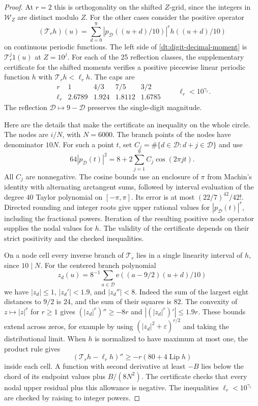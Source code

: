 \documentclass[11pt,a4paper]{article}
\theoremstyle{paperplain}
\numberwithin{equation}{section}
\newcommand{\e}{\mathrm e}
\begin{document}
\begin{proof}
At \(r=2\) this is orthogonality on the shifted \(Z\)-grid,
since the integers in \(\mathcal W_Z\) are distinct modulo \(Z\).
For the other cases consider the positive operator
\[
 (\mathcal T_r h)(u)
 =\sum_{d=0}^9 |p_{\mathcal D}((u+d)/10)|^r h((u+d)/10)
\]
on continuous periodic functions. The left side of
\eqref{dt:digit-decimal-moment} is \(\mathcal T_r^j1(u)\) at \(Z=10^j\).
For each of the 25 reflection classes, the supplementary certificate
 for the shifted moments
verifies a positive piecewise linear periodic function \(h\)
with \(\mathcal T_r h<\ell_r h\). The caps are
\[
\begin{array}{c|cccc}
 r&1&4/3&7/5&3/2\\ \hline
 \ell_r&2.6789&1.924&1.8112&1.6785
\end{array}
\qquad \ell_r<10^{\gamma_r}.
\]
The reflection \(\mathcal D\mapsto9-\mathcal D\) preserves the single-digit magnitude.

Here are the details that make the certificate an inequality on the
whole circle. The nodes are \(i/N\), with \(N=6000\).
The branch points of the nodes have
denominator \(10N\). For such a point \(t\), set
\(C_j=\#\{d\in\mathcal D:d+j\in\mathcal D\}\) and use
\[
 64|p_{\mathcal D}(t)|^2=8+2\sum_{j=1}^{9}C_j\cos(2\pi jt).
\]
All \(C_j\) are nonnegative. The cosine bounds use an enclosure
of \(\pi\) from Machin's identity with alternating arctangent
sums, followed by interval evaluation of the degree \(40\)
Taylor polynomial on \([-\pi,\pi]\). Its error is at most
\((22/7)^{42}/42!\). Directed rounding and integer roots give
upper rational values for \(|p_{\mathcal D}(t)|^r\), including the fractional
powers. Iteration of the resulting positive node operator supplies
the nodal values for \(h\). The validity of the certificate depends
on their strict positivity and the checked inequalities.

On a node cell every inverse branch of \(\mathcal T_r\) lies in a
single linearity interval of \(h\), since \(10\mid N\). For the
centered branch polynomial
\[
 z_d(u)=8^{-1}\sum_{a\in\mathcal D}\e((a-9/2)(u+d)/10)
\]
we have \(|z_d|\le1\), \(|z_d'|<1.9\), and \(|z_d''|<8\).
Indeed the sum of the largest eight distances to \(9/2\) is
\(24\), and the sum of their squares is \(82\).
The convexity of \(z\mapsto |z|^r\) for \(r\ge1\) gives
\((|z_d|^r)''\ge-8r\) and \(|(|z_d|^r)'|\le1.9r\).
These bounds extend across zeros, for example by using
\((|z_d|^2+\varepsilon)^{r/2}\) and taking the distributional
limit. When \(h\) is normalized to have maximum at most one,
the product rule gives
\[
 (\mathcal T_r h-\ell_rh)''
 \ge -r(80+4\operatorname{Lip}h)
\]
inside each cell. A function with second derivative at least
\(-B\) lies below the chord of its endpoint values plus
\(B/(8N^2)\). The certificate checks that every nodal upper
residual plus this allowance is negative. The inequalities
\(\ell_r<10^{\gamma_r}\) are checked by raising to integer powers.


\end{proof}
\end{document}
